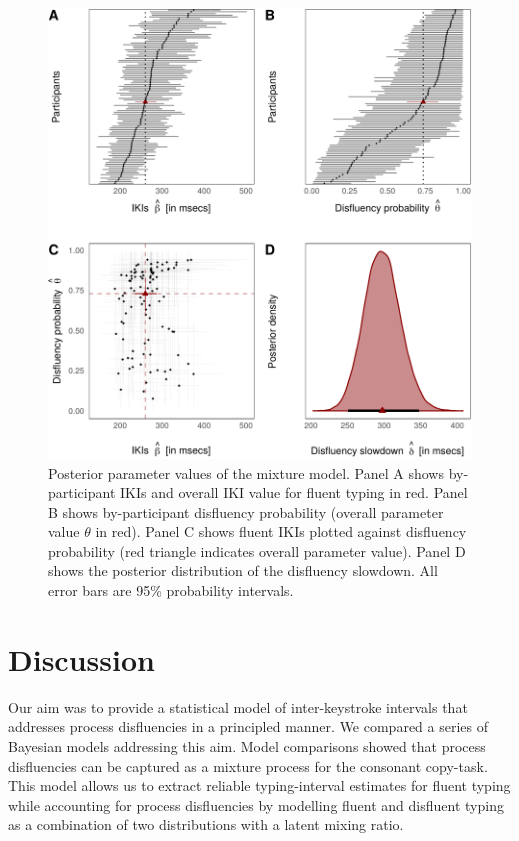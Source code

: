 \documentclass[english,man,floatsintext]{apa7}
\begin{document}
\begin{figure}[!ht]

{\centering \includegraphics{report_files/figure-latex/parameters-1} 

}

\caption{Posterior parameter values of the mixture model. Panel A shows by-participant IKIs and overall IKI value for fluent typing in red. Panel B shows by-participant disfluency probability (overall parameter value $\theta$ in red). Panel C shows fluent IKIs plotted against disfluency probability (red triangle indicates overall parameter value). Panel D shows the posterior distribution of the disfluency slowdown. All error bars are 95\% probability intervals.}\label{fig:parameters}
\end{figure}

\hypertarget{discussion}{%
\section{Discussion}\label{discussion}}

Our aim was to provide a statistical model of inter-keystroke intervals that addresses process disfluencies in a principled manner. We compared a series of Bayesian models addressing this aim. Model comparisons showed that process disfluencies can be captured as a mixture process for the consonant copy-task. This model allows us to extract reliable typing-interval estimates for fluent typing while accounting for process disfluencies by modelling fluent and disfluent typing as a combination of two distributions with a latent mixing ratio.
\end{document}
